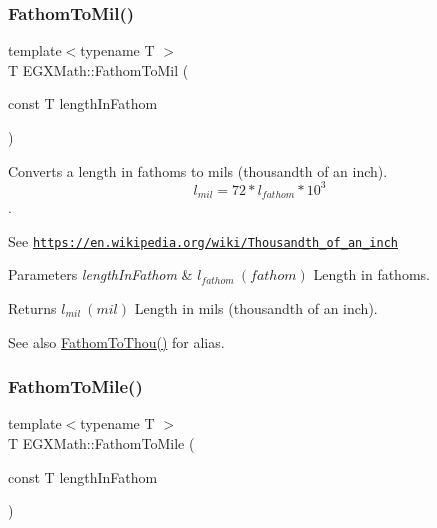 \subsubsection{\texorpdfstring{Fathom\+To\+Mil()}{FathomToMil()}}
{\footnotesize\ttfamily template$<$typename T $>$ \\
T E\+G\+X\+Math\+::\+Fathom\+To\+Mil (\begin{DoxyParamCaption}\item[{const T}]{length\+In\+Fathom }\end{DoxyParamCaption})}



Converts a length in fathoms to mils (thousandth of an inch). \[ l_{mil}=72 * l_{fathom} * 10^{3} \]. 

See \href{https://en.wikipedia.org/wiki/Thousandth_of_an_inch}{\tt https\+://en.\+wikipedia.\+org/wiki/\+Thousandth\+\_\+of\+\_\+an\+\_\+inch} 
\begin{DoxyParams}{Parameters}
{\em length\+In\+Fathom} & $ l_{fathom}\ (fathom)$ Length in fathoms. \\
\hline
\end{DoxyParams}
\begin{DoxyReturn}{Returns}
$ l_{mil}\ (mil)$ Length in mils (thousandth of an inch). 
\end{DoxyReturn}
\begin{DoxySeeAlso}{See also}
\mbox{\hyperlink{group___e_g_x_math-_conversions-_length_conversions-_imperial-_fathom-_imperial_ga869f851e88866f34c0dca73f1b69bb21}{Fathom\+To\+Thou()}} for alias. 
\end{DoxySeeAlso}
\mbox{\label{group___e_g_x_math-_conversions-_length_conversions-_imperial-_fathom-_imperial_ga4922ca5fe88bedc7aaa78d15e64a5534}} 
\subsubsection{\texorpdfstring{Fathom\+To\+Mile()}{FathomToMile()}}
{\footnotesize\ttfamily template$<$typename T $>$ \\
T E\+G\+X\+Math\+::\+Fathom\+To\+Mile (\begin{DoxyParamCaption}\item[{const T}]{length\+In\+Fathom }\end{DoxyParamCaption})}



